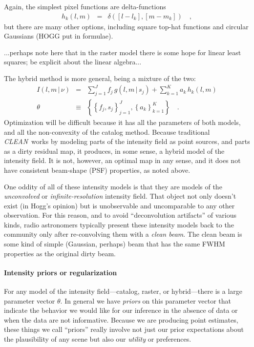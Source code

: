 \documentclass[12pt]{article}
\newcommand{\project}[1]{\textsl{#1}}
\newcommand{\CLEAN}{\project{CLEAN}}
\newcommand{\set}[1]{\left\{{#1}\right\}}
\newcommand{\given}{\,|\,}
\begin{document}
Again, the simplest pixel functions are delta-functions
\begin{eqnarray}
h_k(l,m) &=& \delta([l-l_k], [m-m_k])
\quad,
\end{eqnarray}
but there are many other options, including square top-hat functions
and circular Gaussians (HOGG put in formulae).

...perhaps note here that in the raster model there is some hope for
linear least squares; be explicit about the linear algebra...

The hybrid method is more general, being a mixture of the two:
\begin{eqnarray}
I(l,m\given\nu) &=& \sum_{j=1}^J f_j\,g(l,m\given s_j)
                  + \sum_{k=1}^K a_k\,h_k(l,m)
\\
\theta &\equiv& \set{\set{f_j, s_j}_{j=1}^J, \set{a_k}_{k=1}^K}
\quad.
\end{eqnarray}
Optimization will be difficult because it has all the parameters of
both models, and all the non-convexity of the catalog method.  Because
traditional \CLEAN\ works by modeling parts of the intensity field as
point sources, and parts as a dirty residual map, it produces, in some
sense, a hybrid model of the intensity field.  It is not, however, an
optimal map in any sense, and it does not have consistent beam-shape
(PSF) properties, as noted above.

One oddity of all of these intensity models is that they are models of
the \emph{unconvolved} or \emph{infinite-resolution} intensity field.
That object not only doesn't exist (in Hogg's opinion) but is
unobservable and uncomparable to any other observation.  For this
reason, and to avoid ``deconvolution artifacts'' of various kinds,
radio astronomers typically present these intensity models back to the
community only after re-convolving them with a \emph{clean beam}.  The
clean beam is some kind of simple (Gaussian, perhaps) beam that has
the same FWHM properties as the original dirty beam.

\paragraph{Intensity priors or regularization}

For any model of the intensity field---catalog, raster, or
hybrid---there is a large parameter vector $\theta$.  In general we
have \emph{priors} on this parameter vector that indicate the behavior
we would like for our inference in the absence of data or when the
data are not informative.  Because we are producing point estimates,
these things we call ``priors'' really involve not just our prior
expectations about the plausibility of any scene but also our
\emph{utility} or preferences.
\end{document}
